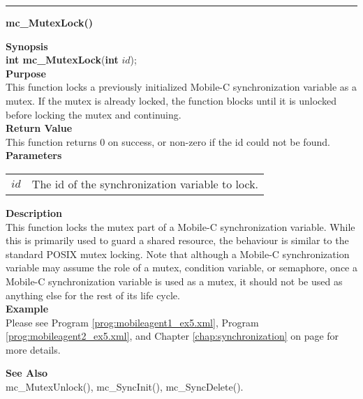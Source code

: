 \noindent
\vspace{5pt}
\rule{6.5in}{0.015in}
\noindent
{}
{\LARGE \bf mc\_MutexLock()}\\
\label{api:mc_MutexLock()}

\noindent
{\bf Synopsis}\\
{\bf int mc\_MutexLock}({\bf int} $id$);\\

\noindent
{\bf Purpose}\\
This function locks a previously initialized Mobile-C synchronization variable 
as a mutex. 
If the mutex is already locked, the function blocks until it is unlocked 
before locking the mutex and continuing. \\

\noindent
{\bf Return Value}\\
This function returns 0 on success, or non-zero if the id could not be found.\\

\noindent
{\bf Parameters}
\vspace{-0.1pt}
\begin{description}
\item
\begin{tabular}{p{10 mm}p{145 mm}} 
$id$ & The id of the synchronization variable to lock. 
\end{tabular}
\end{description}

\noindent
{\bf Description}\\
This function locks the mutex part of a Mobile-C synchronization variable. 
While this is primarily used to guard a shared resource, the behaviour is 
similar to the standard POSIX mutex locking. 
Note that although a Mobile-C synchronization variable may assume the
role of a mutex, condition variable, or semaphore, once a Mobile-C 
synchronization variable is used as a mutex, it should not be used as anything 
else for the rest of its life cycle.\\ 

\noindent
{\bf Example}\\
Please see Program \vref{prog:mobileagent1_ex5.xml}, Program 
\vref{prog:mobileagent2_ex5.xml}, and Chapter \ref{chap:synchronization}
on page \pageref{chap:synchronization} for more details.\\
\noindent

\noindent
{\bf See Also}\\
mc\_MutexUnlock(), mc\_SyncInit(), mc\_SyncDelete().\\

